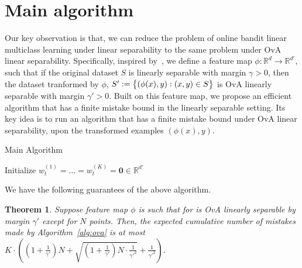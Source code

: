 \documentclass{article}
\newcommand{\field}[1]{\mathbb{#1}}
\newcommand{\fR}{\field{R}}
\newtheorem{theorem}{Theorem}
\begin{document}
\section{Main algorithm}
Our key observation is that, we can reduce the problem of online bandit linear multiclass learning under linear separability to the same problem under OvA linear separability. Specifically, inspired by~\cite{klivans2004learning}, we define
a feature map $\phi: \fR^d \to \fR^{d'}$, such that if the original dataset $S$ is linearly separable with margin $\gamma > 0$, then the dataset tranformed by $\phi$, $S' := \cbr{(\phi(x), y): (x,y) \in S}$ is OvA linearly separable with margin $\gamma' > 0$. Built on this feature map, we propose an efficient algorithm that has a finite mistake bound in the linearly separable setting. Its key idea is to
run an algorithm that has a finite mistake bound under OvA linear separability, upon the transformed examples $(\phi(x), y)$.


\begin{algorithm}[H]
\caption{Main Algorithm}
\label{alg:ova}
Initialize $w_t^{(1)}=\ldots=w_t^{(K)}=\mathbf{0}\in \mathbb{R}^{d'}$\\
\end{algorithm}

We have the following guarantees of the above algorithm.
\begin{theorem}
Suppose feature map $\phi$ is such that for  is OvA linearly separable by margin $\gamma'$ except for $N$ points. Then,
the expected cumulative number of mistakes made by Algorithm~\ref{alg:ova} is at most $K \cdot ( (1 + \frac 1 {\gamma'}) N + \sqrt{ (1 + \frac 1 {\gamma'}) N \cdot \frac{1}{\gamma'^2} } + \frac{1}{\gamma'^2})$.
\end{theorem}
\end{document}
